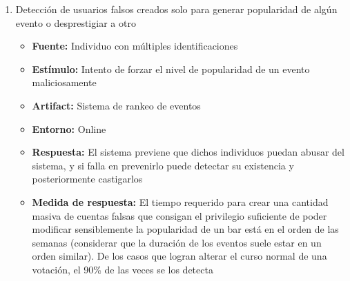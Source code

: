 \begin{enumerate}
\item Detección de usuarios falsos creados solo para generar popularidad de algún evento o desprestigiar a otro
  \begin{itemize}  
    \item \textbf{\textbf{Fuente:}} Individuo con múltiples identificaciones
    \item \textbf{\textbf{Estímulo:}} Intento de forzar el nivel de popularidad de un evento maliciosamente 
    \item \textbf{\textbf{Artifact:}} Sistema de rankeo de eventos
    \item \textbf{\textbf{Entorno:}} Online
    \item \textbf{\textbf{Respuesta:}} El sistema previene que dichos individuos puedan abusar del sistema, y si falla en prevenirlo puede detectar su existencia y posteriormente castigarlos
    \item \textbf{\textbf{Medida de respuesta:}} El tiempo requerido para crear una cantidad masiva de cuentas falsas que consigan el privilegio suficiente de poder modificar sensiblemente la popularidad de un bar está en el orden de las semanas (considerar que la duración de los eventos suele estar en un orden similar). De los casos que logran alterar el curso normal de una votación, el 90\% de las veces se los detecta
  \end{itemize}
\end{enumerate}

